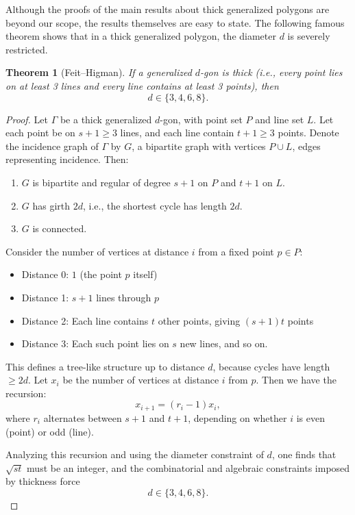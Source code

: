 \documentclass[12pt,a4paper,openany]{book}
\newtheorem{theorem}{Theorem}[section]
\begin{document}
Although the proofs of the main results about thick generalized polygons are beyond our scope, the results themselves are easy to state. The following famous theorem shows that in a thick generalized polygon, the diameter $d$ is severely restricted.

\begin{theorem}[Feit--Higman]\label{thm:feit-higman}
If a generalized $d$-gon is thick (i.e., every point lies on at least 3 lines and every line contains at least 3 points), then
\[
d \in \{3,4,6,8\}.
\]
\end{theorem}

\begin{proof}
Let $\Gamma$ be a thick generalized $d$-gon, with point set $P$ and line set $L$. Let each point be on $s+1 \ge 3$ lines, and each line contain $t+1 \ge 3$ points. Denote the incidence graph of $\Gamma$ by $G$, a bipartite graph with vertices $P \cup L$, edges representing incidence. Then:

\begin{enumerate}
    \item $G$ is bipartite and regular of degree $s+1$ on $P$ and $t+1$ on $L$.
    \item $G$ has girth $2d$, i.e., the shortest cycle has length $2d$.
    \item $G$ is connected.
\end{enumerate}

Consider the number of vertices at distance $i$ from a fixed point $p \in P$:
\begin{itemize}
    \item Distance 0: $1$ (the point $p$ itself)
    \item Distance 1: $s+1$ lines through $p$
    \item Distance 2: Each line contains $t$ other points, giving $(s+1) t$ points
    \item Distance 3: Each such point lies on $s$ new lines, and so on.
\end{itemize}

This defines a tree-like structure up to distance $d$, because cycles have length $\ge 2d$. Let $x_i$ be the number of vertices at distance $i$ from $p$. Then we have the recursion:
\[
x_{i+1} = (r_i - 1) x_i,
\]
where $r_i$ alternates between $s+1$ and $t+1$, depending on whether $i$ is even (point) or odd (line).

Analyzing this recursion and using the diameter constraint of $d$, one finds that $\sqrt{st}$ must be an integer, and the combinatorial and algebraic constraints imposed by thickness force
\[
d \in \{3,4,6,8\}.
\]


\end{proof}
\end{document}

